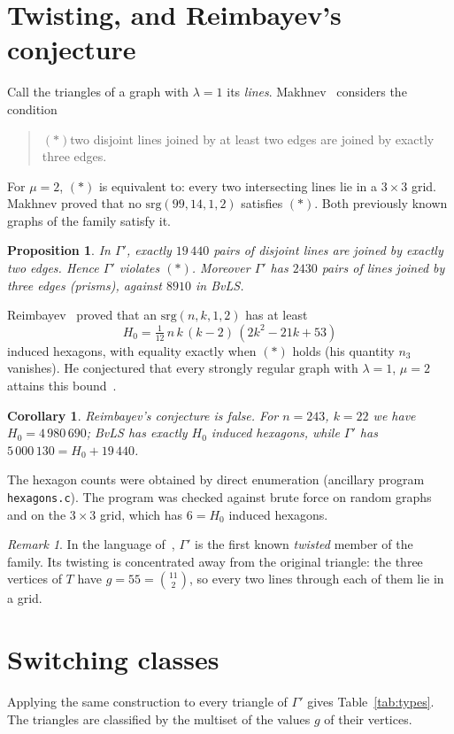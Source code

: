 \documentclass[11pt]{amsart}
\newtheorem{proposition}[theorem]{Proposition}
\newtheorem{corollary}[theorem]{Corollary}
\theoremstyle{remark}
\newtheorem{remark}[theorem]{Remark}
\begin{document}
\section{Twisting, and Reimbayev's conjecture}
Call the triangles of a graph with $\lambda=1$ its \emph{lines}. Makhnev~\cite{Mak} considers the condition
\begin{quote}
$(*)$\quad two disjoint lines joined by at least two edges are joined by exactly three edges.
\end{quote}
For $\mu=2$, $(*)$ is equivalent to: every two intersecting lines lie in a $3\times3$ grid. Makhnev proved that no
$\mathrm{srg}(99,14,1,2)$ satisfies $(*)$. Both previously known graphs of the family satisfy it.

\begin{proposition}\label{prop:twist}
In $\Gamma'$, exactly $19\,440$ pairs of disjoint lines are joined by exactly two edges. Hence $\Gamma'$ violates $(*)$.
Moreover $\Gamma'$ has $2430$ pairs of lines joined by three edges (prisms), against $8910$ in BvLS.
\end{proposition}

Reimbayev~\cite{Rei} proved that an $\mathrm{srg}(n,k,1,2)$ has at least
\[
H_0=\tfrac1{12}\,n\,k\,(k-2)\,(2k^2-21k+53)
\]
induced hexagons, with equality exactly when $(*)$ holds (his quantity $n_3$ vanishes). He conjectured that every strongly
regular graph with $\lambda=1$, $\mu=2$ attains this bound~\cite[\S4]{Rei}.

\begin{corollary}\label{cor:rei}
Reimbayev's conjecture is false. For $n=243$, $k=22$ we have $H_0=4\,980\,690$; BvLS has exactly $H_0$ induced hexagons,
while $\Gamma'$ has $5\,000\,130=H_0+19\,440$.
\end{corollary}
The hexagon counts were obtained by direct enumeration (ancillary program \texttt{hexagons.c}). The program was checked
against brute force on random graphs and on the $3\times3$ grid, which has $6=H_0$ induced hexagons.

\begin{remark}
In the language of~\cite{Mak}, $\Gamma'$ is the first known \emph{twisted} member of the family. Its twisting is concentrated away from the original triangle: the three vertices of $T$ have $g=55=\binom{11}{2}$, so every two lines through each of them lie in a grid.
\end{remark}

\section{Switching classes}
Applying the same construction to every triangle of $\Gamma'$ gives Table~\ref{tab:types}. The triangles are classified
by the multiset of the values $g$ of their vertices.
\end{document}
